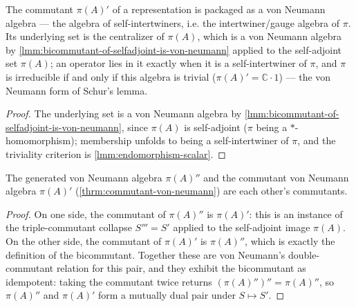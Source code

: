 \begin{theorem}
    \label{thrm:commutant-von-neumann}
    \leanok
    The commutant $\pi(A)'$ of a representation is packaged as a von Neumann algebra --- the algebra of self-intertwiners, i.e. the intertwiner/gauge algebra of $\pi$. Its underlying set is the centralizer of $\pi(A)$, which is a von Neumann algebra by \ref{lmm:bicommutant-of-selfadjoint-is-von-neumann} applied to the self-adjoint set $\pi(A)$; an operator lies in it exactly when it is a self-intertwiner of $\pi$, and $\pi$ is irreducible if and only if this algebra is trivial ($\pi(A)' = \mathbb{C}\cdot 1$) --- the von Neumann form of Schur's lemma.
\end{theorem}
\begin{proof}
    \leanok
    The underlying set is a von Neumann algebra by \ref{lmm:bicommutant-of-selfadjoint-is-von-neumann}, since $\pi(A)$ is self-adjoint ($\pi$ being a $*$-homomorphism); membership unfolds to being a self-intertwiner of $\pi$, and the triviality criterion is \ref{lmm:endomorphism-scalar}.
\end{proof}

\begin{theorem}
    \label{thrm:double-commutant-duality}
    \leanok
    The generated von Neumann algebra $\pi(A)''$ and the commutant von Neumann algebra $\pi(A)'$ (\ref{thrm:commutant-von-neumann}) are each other's commutants.
\end{theorem}
\begin{proof}
    \leanok
    On one side, the commutant of $\pi(A)''$ is $\pi(A)'$: this is an instance of the triple-commutant collapse $S''' = S'$ applied to the self-adjoint image $\pi(A)$. On the other side, the commutant of $\pi(A)'$ is $\pi(A)''$, which is exactly the definition of the bicommutant. Together these are von Neumann's double-commutant relation for this pair, and they exhibit the bicommutant as idempotent: taking the commutant twice returns $(\pi(A)'')'' = \pi(A)''$, so $\pi(A)''$ and $\pi(A)'$ form a mutually dual pair under $S \mapsto S'$.
\end{proof}

